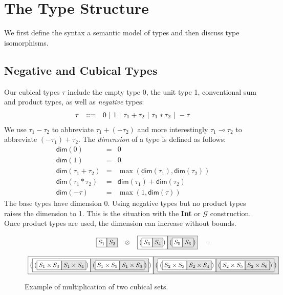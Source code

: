 \documentclass[authoryear,preprint]{sigplanconf}
\newcommand{\bdim}[1]{\textsf{dim}(#1)}
\newcommand{\lolli}{\multimap}
\newcommand{\nodet}[2]{\fcolorbox{black}{white}{$#1$}\fcolorbox{black}{gray!20}{$#2$}}
\begin{document}
\section{The Type Structure}

We first define the syntax a semantic model of types and then discuss type
isomorphisms.

\subsection{Negative and Cubical Types}

Our cubical types $\tau$ include the empty type 0, the unit type 1,
conventional sum and product types, as well as \emph{negative} types:
\[\begin{array}{rcl}
\tau &::=& 0 ~|~ 1 ~|~ \tau_1 + \tau_2 ~|~ \tau_1 * \tau_2 ~|~ - \tau
\end{array}\]
We use $\tau_1 - \tau_2$ to abbreviate $\tau_1 + (- \tau_2)$ and more
interestingly $\tau_1 \lolli \tau_2$ to abbreviate $(- \tau_1) + \tau_2$.
The \emph{dimension} of a type is defined as follows:
\[\begin{array}{rcl}
\bdim{0} &=& 0 \\
\bdim{1} &=& 0 \\
\bdim{\tau_1 + \tau_2} &=& \max(\bdim{\tau_1},\bdim{\tau_2}) \\
\bdim{\tau_1 * \tau_2} &=& \bdim{\tau_1} + \bdim{\tau_2} \\
\bdim{- \tau} &=& \max(1,\bdim{\tau})
\end{array}\]
The base types have dimension 0. Using negative types but no product types
raises the dimension to 1. This is the situation with the \textbf{Int} or
$\mathcal{G}$ construction. Once product types are used, the dimension can
increase without bounds.

\begin{figure*}
\[\begin{array}{c}
\nodet{S_1}{S_2}
\quad\otimes\quad
\nodet{(\nodet{S_3}{S_4})}{(\nodet{S_5}{S_6})} \quad= \\
\\
\nodet{(\nodet{{(\nodet{S_1 \times S_3}{S_1 \times S_4})}}
              {{(\nodet{S_1 \times S_5}{S_1 \times S_6})}})}
      {(\nodet{{(\nodet{S_2 \times S_3}{S_2 \times S_4})}}
              {{(\nodet{S_2 \times S_5}{S_2 \times S_6})}})}
\end{array}\]
\caption{\label{mult}Example of multiplication of two cubical sets.}
\end{figure*}
\end{document}
